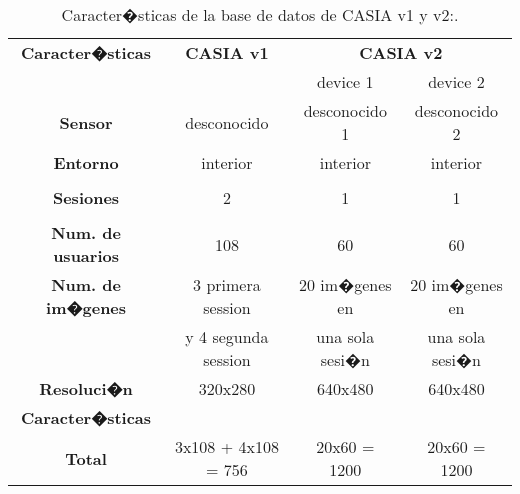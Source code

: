 \begin{table}[h]
    \centering
    \scriptsize
    \begin{tabular}{|c|c|c|c|}
        \hline
        \textbf{Caracter�sticas}   & \textbf{CASIA v1}      & \multicolumn{2}{|c|}{\textbf{CASIA v2}} \\
        \cline{3-4}
                                   &                        & device 1          & device 2       \\
        \hline
        \textbf{Sensor}            & desconocido            & desconocido 1     & desconocido 2  \\
        \hline
        \textbf{Entorno}           & interior               & interior          & interior        \\
        \hline
                                   &                        &                   &                \\
        \textbf{Sesiones}          & 2                      & 1                 & 1              \\
                                   &                        &                   &                \\
        \hline
        \textbf{Num. de usuarios}  & 108                    & 60                & 60             \\
        \hline
        \textbf{Num. de im�genes}  & 3 primera session      & 20 im�genes en    & 20 im�genes en \\
                                   & y 4 segunda session    & una sola sesi�n   & una sola sesi�n\\
        \hline
        \textbf{Resoluci�n}        & 320x280                & 640x480           & 640x480        \\
        \hline
        \textbf{Caracter�sticas}   &                        &                   &                \\
        \hline
        \textbf{Total}             & 3x108 + 4x108 = 756    & 20x60 = 1200      & 20x60 = 1200   \\
        \hline
    \end{tabular}
    \caption{Caracter�sticas de la base de datos de CASIA v1 y v2:\citet{database:CASIA_web}.}
    \label{table:info_CASIAv1_2}
\end{table}

